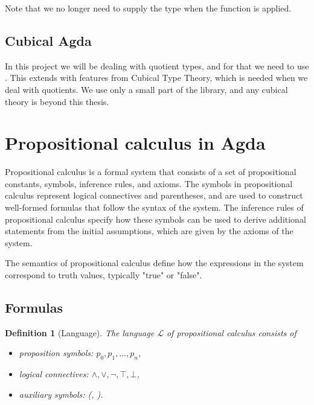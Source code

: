 \documentclass[titlepage]{article}
\newtheorem{definition}{Definition}[section]
\begin{document}
Note that we no longer need to supply the type when the function is applied.


\subsection{Cubical Agda}
In this project we will be dealing with quotient types, and for that we need to use \CubicalAgda. This extends \Agda with features from Cubical Type Theory, which is needed when we deal with quotients.\cite{AgdaDoc} We use only a small part of the \agdaCubical library, and any cubical theory is beyond this thesis.



\section{Propositional calculus in Agda}

Propositional calculus is a formal system that consists of a set of propositional constants, symbols, inference rules, and axioms. The symbols in propositional calculus represent logical connectives and parentheses, and are used to construct well-formed formulas that follow the syntax of the system. The inference rules of propositional calculus specify how these symbols can be used to derive additional statements from the initial assumptions, which are given by the axioms of the system.

The semantics of propositional calculus define how the expressions in the system correspond to truth values, typically "true" or "false". 



\subsection{Formulas}

\begin{definition}[Language]\label{language}
    The language $\mathcal{L}$ of propositional calculus consists of
    \begin{itemize}
        \item proposition symbols: $p_0,p_1,\hdots,p_n$,
        \item logical connectives: $\wedge,\vee,\neg,\top,\bot$,
        \item auxiliary symbols: (, ).
    \end{itemize}
\end{definition}
\end{document}
